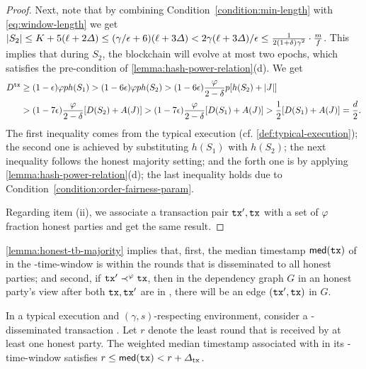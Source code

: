 \begin{proof}
    Next, note that by combining Condition~\eqref{condition:min-length} with \cref{eq:window-length} we get $|S_2| \le K + 5(\ell + 2\varDelta) \le (\gamma / \epsilon + 6)(\ell + 3\varDelta) < 2\gamma (\ell + 3\varDelta) / \epsilon \le \frac{1}{2(1 + \delta) \gamma^2} \cdot \frac{m}{f}$.
    This implies that during $S_2$, the blockchain will evolve at most two epochs, which satisfies the pre-condition of \cref{lemma:hash-power-relation}(d).
    We get
    \begin{align*}
        D^{\mathtt{tx}} & \ge (1 - \epsilon) \varphi p h(S_1) > (1 - 6\epsilon)\varphi p h(S_2) > (1 - 6\epsilon) \frac{\varphi}{2 - \delta} p [h(S_2) + |J|]                                     \\
                & > (1 - 7\epsilon) \frac{\varphi}{2 - \delta} [D(S_2) + A(J)] >  (1 - 7\epsilon) \frac{\varphi}{2 - \delta} [D(S_1) + A(J)] > \frac{1}{2} [D(S_1) + A(J)] = \frac{d}{2}.
    \end{align*}
    The first inequality comes from the typical execution (cf. \cref{def:typical-execution}); the second one is achieved by substituting $h(S_1)$ with $h(S_2)$; the next inequality follows the honest majority setting; and the forth one is by applying \cref{lemma:hash-power-relation}(d); the last inequality holds due to Condition~\eqref{condition:order-fairness-param}.

    Regarding item (ii), we associate a transaction pair $\mathtt{tx}', \mathtt{tx}$ with a set of $\varphi$ fraction honest parties and get the same result.
\end{proof}

\cref{lemma:honest-tb-majority} implies that, first, the median timestamp $\mathsf{med}(\mathtt{tx})$ of \tx in the \PBWindowLen-time-window is within the \txDelay rounds that \tx is disseminated to all honest parties; and second, if $\mathtt{tx}' \prec^\varphi \mathtt{tx}$, then in the dependency graph $G$ in an honest party's view after both $\mathtt{tx}, \mathtt{tx}'$ are in \txpool, there will be an edge $(\mathtt{tx}', \mathtt{tx})$ in $G$.

\begin{lemma} \label{lemma:median-timestamp}
    In a typical execution and $(\gamma, s)$-respecting environment, consider a \txDelay-disseminated transaction \tx.
    Let $r$ denote the least round that \tx is received by at least one honest party.
    The weighted median timestamp associated with \tx in its \PBWindowLen-time-window satisfies $r \le \mathsf{med}(\mathtt{tx}) < r + \varDelta_{\mathrm{tx}}$.
\end{lemma}

